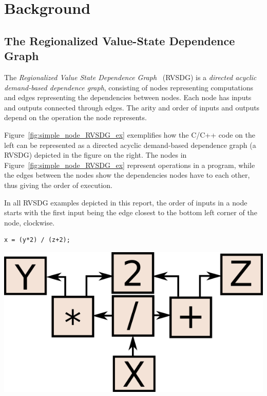 
\clearpage
\section{Background}
\label{background}

\subsection{The Regionalized Value-State Dependence Graph}
\label{background:RVSDG}

The \textit{Regionalized Value State Dependence Graph}~\cite{RVSDG:HiPEACpaper}
(RVSDG) is a \textit{directed acyclic demand-based dependence graph},
consisting of nodes representing computations and edges representing the
dependencies between nodes. Each node has inputs and outputs connected through
edges. The arity and order of inputs and outputs depend on the operation the
node represents.

Figure~\ref{fig:simple_node_RVSDG_ex} exemplifies how the C/C++ code on the left
can be represented as a directed acyclic demand-based dependence graph (a RVSDG)
depicted in the figure on the right. The nodes in
Figure~\ref{fig:simple_node_RVSDG_ex} represent operations in a program, while
the edges between the nodes show the dependencies nodes have to each other, thus
giving the order of execution.

In all RVSDG examples depicted in this report, the order of inputs in a node
starts with the first input being the edge closest to the bottom left corner of
the node, clockwise.

\begin{centering}
	\noindent\begin{minipage}{0.36\textwidth}
		\begin{CenteredBox}
		\begin{lstlisting}[label={lst:simple_node_RVSDG_ex},
style=minipage_customcpp, basicstyle=\fontsize{10}{1}]
x = (y*2) / (z+2);
		\end{lstlisting}
		\end{CenteredBox}
	\end{minipage}
	\noindent\begin{minipage}{0.55\textwidth}
		\captionsetup{type=figure}
		\includegraphics[width=\textwidth]{figures/simple_node_RVSDG_ex}
	\end{minipage}
	\label{fig:simple_node_RVSDG_ex}
\end{centering}

